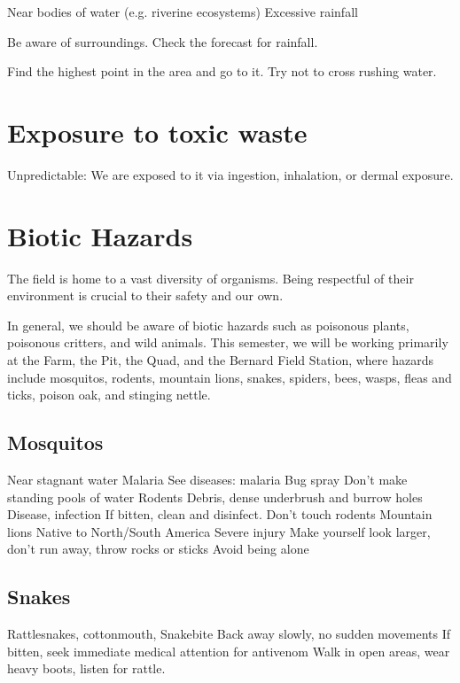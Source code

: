 \documentclass[12pt]{../SOP2}
\begin{document}
Near bodies of water (e.g. riverine ecosystems)
Excessive rainfall

\NP Be aware of surroundings. Check the forecast for rainfall.

\NP Find the highest point in the area and go to it. Try not to cross rushing water. 



\section{Exposure to toxic waste}


Unpredictable: We are exposed to it via ingestion, inhalation, or dermal exposure.


\section{Biotic Hazards}

\NP The field is home to a vast diversity of organisms. Being respectful of their environment is crucial to their safety and our own.

\NP In general, we should be aware of biotic hazards such as poisonous plants, poisonous critters, and wild animals. This semester, we will be working primarily at the Farm, the Pit, the Quad, and the Bernard Field Station, where hazards include mosquitos, rodents, mountain lions, snakes, spiders, bees, wasps, fleas and ticks, poison oak, and stinging nettle.

\subsection{Mosquitos}

Near stagnant water
Malaria
See diseases: malaria
Bug spray
Don’t make standing pools of water
Rodents
Debris, dense underbrush and burrow holes
Disease, infection
If bitten, clean and disinfect.
Don’t touch rodents
Mountain lions
Native to North/South America
Severe injury
Make yourself look larger, don’t run away, throw rocks or sticks
Avoid being alone 


\subsection{Snakes}

Rattlesnakes, cottonmouth, 
Snakebite
Back away slowly, no sudden movements
If bitten, seek immediate medical attention for antivenom
Walk in open areas, wear heavy boots, listen for rattle.
\end{document}
